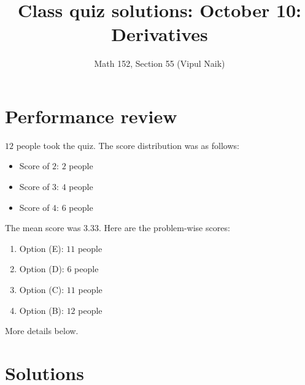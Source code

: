 \documentclass[10pt]{amsart}
\title{Class quiz solutions: October 10: Derivatives}
\author{Math 152, Section 55 (Vipul Naik)}
\begin{document}
\maketitle

\section{Performance review}

$12$ people took the quiz. The score distribution was as follows:

\begin{itemize}
\item Score of $2$: $2$ people
\item Score of $3$: $4$ people
\item Score of $4$: $6$ people
\end{itemize}

The mean score was $3.33$. Here are the problem-wise scores:

\begin{enumerate}
\item Option (E): $11$ people
\item Option (D): $6$ people
\item Option (C): $11$ people
\item Option (B): $12$ people
\end{enumerate}

More details below.
\section{Solutions}
\end{document}
